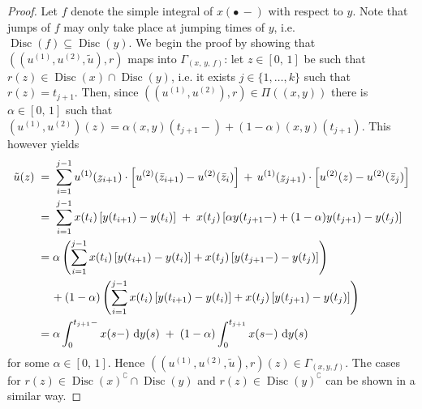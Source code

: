 \documentclass[11pt]{article}
\theoremstyle{definition}\newtheorem{example}[theorem]{Example}
\theoremstyle{definition}\newtheorem{counterexample}[theorem]{Counterexample}
\theoremstyle{definition}\newtheorem{remark}[theorem]{Remark}
\theoremstyle{definition}\newtheorem{defi}[theorem]{Definition}
\numberwithin{equation}{section}
\newcommand{\ubar}[1]{\underaccent{\bar}{#1}}
\newcommand*\diff{\mathop{}\!\mathrm{d}}								%
\renewcommand{\|}{\; : \, \;}											%
\begin{document}
\begin{proof}
	Let $f$ denote the simple integral of $x(\bullet \,-)$ with respect to $y$. Note that jumps of $f$ may only take place at jumping times of $y$, i.e. $\operatorname{Disc}(f) \subseteq \operatorname{Disc}(y)$. We begin the proof by showing that $((u^{(1)}, u^{(2)}, \tilde{u}),r)$ maps into $\Gamma_{(x,\, y,\,f)}$:
	let $ z \in [0,\,1]$ be such that $r(z) \in \operatorname{Disc}(x) \cap \operatorname{Disc}(y)$, i.e. it exists $j \in \{1,\ldots, k\}$ such that $r(z) = t_{j+1}$. Then, since $((u^{(1)}, u^{(2)}),r) \in \Pi((x,y))$ there is $\alpha \in [0,\,1]$ such that
	$(u^{(1)}, u^{(2)})(z)  = \alpha (x, y)(t_{j+1}-)  +  (1-\alpha) (x, y)(t_{j+1})$. This however yields
	\begin{align*}
		\tilde{u}(z) \; &= \; \sum_{i=1}^{j-1} u^{(1)}(\ubar{z}_{i+1}) \cdot \left[u^{(2)}(\bar{z}_{i+1}) - u^{(2)}(\bar{z}_{i})\right] \, + \, u^{(1)}(\ubar{z}_{j+1}) \cdot \left[u^{(2)}(z) - u^{(2)}( \bar{z}_{j})\right] \\
		&= \; \sum_{i=1}^{j-1} x(t_i) \left[y(t_{i+1}) - y(t_{i})\right] \; + \; x(t_j)  \left[\alpha y(t_{j+1}-) +(1-\alpha) y(t_{j+1}) - y(t_{j})\right]\\
		&= \alpha \left(\sum_{i=1}^{j-1} x(t_i)  \left[y(t_{i+1}) - y(t_{i})\right] + x(t_j)  \left[y(t_{j+1}-) - y(t_{j})\right]\right) \\
		& \quad \, + (1-\alpha) \left(\sum_{i=1}^{j-1} x(t_i)  \left[y(t_{i+1}) - y(t_{i})\right] + x(t_j)  \left[y(t_{j+1}) - y(t_{j})\right]\right) \\
		&= \alpha  \int_0^{t_{j+1}-}x(s-)\, \diff y(s) \; + \; (1-\alpha)\int_0^{t_{j+1}}x(s-)\, \diff y(s)
	\end{align*}
	for some $\alpha \in [0,\,1]$. Hence $((u^{(1)}, u^{(2)},\tilde{u}),r)(z) \in \Gamma_{(x,y,f)}$.
	The cases for $r(z) \in \operatorname{Disc}(x)^\complement \cap \operatorname{Disc}(y)$ and $r(z) \in \operatorname{Disc}(y)^\complement$ can be shown in a similar way.
	

\end{proof}
\end{document}
